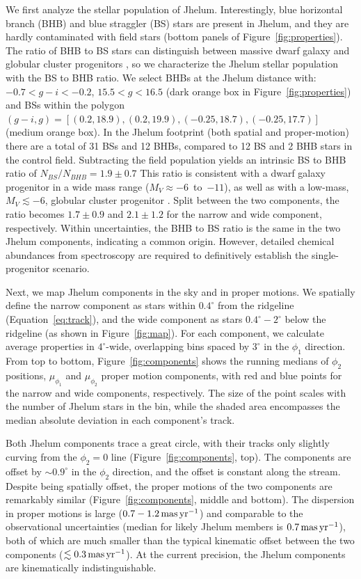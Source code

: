 \documentclass[twocolumn]{aastex62}
\begin{document}
We first analyze the stellar population of Jhelum.
Interestingly, blue horizontal branch (BHB) and blue straggler (BS) stars are present in Jhelum, and they are hardly contaminated with field stars (bottom panels of Figure~\ref{fig:properties}).
The ratio of BHB to BS stars can distinguish between massive dwarf galaxy and globular cluster progenitors \citep[e.g.,][]{deason2015}, so we characterize the Jhelum stellar population with the BS to BHB ratio.
We select BHBs at the Jhelum distance with: $-0.7<g-i<-0.2$, $15.5<g<16.5$ (dark orange box in Figure~\ref{fig:properties}) and BSs within the polygon $(g-i,g) = [(0.2,18.9), (0.2, 19.9), (-0.25, 18.7), (-0.25,17.7)]$ (medium orange box).
In the Jhelum footprint (both spatial and proper-motion) there are a total of 31 BSs and 12 BHBs, compared to 12 BS and 2 BHB stars in the control field.
Subtracting the field population yields an intrinsic BS to BHB ratio of $N_{BS} / N_{BHB} = 1.9\pm 0.7$
This ratio is consistent with a dwarf galaxy progenitor in a wide mass range ($M_V\approx-6$~to~$-11$), as well as with a low-mass, $M_V\lesssim-6$, globular cluster progenitor \citep{deason2015}.
Split between the two components, the ratio becomes $1.7\pm0.9$ and $2.1\pm1.2$ for the narrow and wide component, respectively.
Within uncertainties, the BHB to BS ratio is the same in the two Jhelum components, indicating a common origin.
However, detailed chemical abundances from spectroscopy are required to definitively establish the single-progenitor scenario.

Next, we map Jhelum components in the sky and in proper motions.
We spatially define the narrow component as stars within $0.4^\circ$ from the ridgeline (Equation~\ref{eq:track}), and the wide component as stars $0.4^\circ-2^\circ$ below the ridgeline (as shown in Figure~\ref{fig:map}).
For each component, we calculate average properties in $4^\circ$-wide, overlapping bins spaced by $3^\circ$ in the $\phi_1$ direction.
From top to bottom, Figure~\ref{fig:components} shows the running medians of $\phi_2$ positions, $\mu_{\phi_1}$ and $\mu_{\phi_2}$ proper motion components, with red and blue points for the narrow and wide components, respectively.
The size of the point scales with the number of Jhelum stars in the bin, while the shaded area encompasses the median absolute deviation in each component's track.

Both Jhelum components trace a great circle, with their tracks only slightly curving from the $\phi_2=0$ line (Figure~\ref{fig:components}, top).
The components are offset by $\sim0.9^\circ$ in the $\phi_2$ direction, and the offset is constant along the stream.
Despite being spatially offset, the proper motions of the two components are remarkably similar (Figure~\ref{fig:components}, middle and bottom).
The dispersion in proper motions is large ($0.7-1.2\,\rm mas\,yr^{-1}$) and comparable to the observational uncertainties (median for likely Jhelum members is $0.7\rm\, mas\, yr^{-1}$), both of which are much smaller than the typical kinematic offset between the two components ($\lesssim0.3\,\rm mas\,yr^{-1}$).
At the current precision, the Jhelum components are kinematically indistinguishable.
\end{document}
